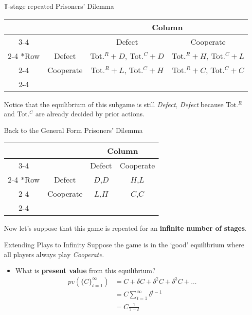 \begin{frame}{$\mathbb{T}$-stage repeated Prisoners' Dilemma}
  \begin{center}
    \begin{tabular}{*{4}{c|}}
      \multicolumn{2}{c}{} & \multicolumn{2}{c}{Column} \\ \cline{3-4}
      \multicolumn{1}{c}{} &        & Defect & Cooperate \\ \cline{2-4}
      \multirow{2}*{Row} & Defect   & Tot.$^R + D$, Tot.$^C + D$ & Tot.$^R + H$, Tot.$^C + L$ \\ \cline{2-4}
                         & Cooperate& Tot.$^R + L$, Tot.$^C + H$ & Tot.$^R + C$, Tot.$^C + C$ \\ \cline{2-4}
    \end{tabular} 
  \end{center}
  Notice that the equilibrium of this subgame is still \textit{Defect}, \textit{Defect}
  because Tot.$^R$ and Tot.$^C$ are already decided by prior actions. 
\end{frame}

\begin{frame}{Back to the General Form Prisoners' Dilemma}
  \begin{table}[!h]
    \centering
    \begin{tabular}{*{4}{c|}}
      \multicolumn{2}{c}{} & \multicolumn{2}{c}{Column} \\ \cline{3-4}
      \multicolumn{1}{c}{} &         & Defect  & Cooperate \\ \cline{2-4}
      \multirow{2}*{Row} &    Defect & $D$,$D$ & $H$,$L$   \\ \cline{2-4}
                         & Cooperate & $L$,$H$ & $C$,$C$   \\ \cline{2-4} 
    \end{tabular} 
  \end{table} 
  Now let's suppose that this game is repeated for an \textbf{infinite number of stages}.
\end{frame}

\begin{frame}{Extending Plays to Infinity}
  Suppose the game is in the `good' equilibrium where all players always play \textit{Cooperate}.
  \begin{itemize}
    \item What is \textbf{present value} from this equilibrium? 
    \begin{align*}
      pv\left(\{ C \}_{t=1}^{\infty}\right) & = C + \delta C + \delta^2 C + \delta^3 C + ... \\ 
         & = C \sum_{t=1}^{\infty} \delta^{t-1} \\
         & = C \frac{1}{1-\delta}
    \end{align*}
  \end{itemize}
\end{frame}


